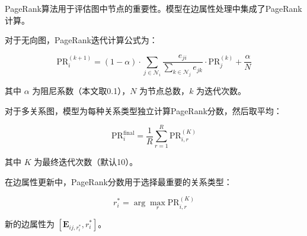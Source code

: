 PageRank算法用于评估图中节点的重要性。模型在边属性处理中集成了PageRank计算。

对于无向图，PageRank迭代计算公式为：

\begin{equation}
\text{PR}^{(k+1)}_i = (1 - \alpha) \cdot \sum_{j \in \mathcal{N}_i} \frac{e_{ji}}{\sum_{k \in \mathcal{N}_j} e_{jk}} \cdot \text{PR}^{(k)}_j + \frac{\alpha}{N}
\end{equation}

其中 $\alpha$ 为阻尼系数（本文取0.1），$N$ 为节点总数，$k$ 为迭代次数。

对于多关系图，模型为每种关系类型独立计算PageRank分数，然后取平均：

\begin{equation}
\text{PR}_i^{\text{final}} = \frac{1}{R} \sum_{r=1}^{R} \text{PR}_{i,r}^{(K)}
\end{equation}

其中 $K$ 为最终迭代次数（默认10）。

在边属性更新中，PageRank分数用于选择最重要的关系类型：

\begin{equation}
r_i^* = \arg\max_r \text{PR}_{i,r}^{(K)}
\end{equation}

新的边属性为 $[\mathbf{E}_{ij,r_i^*}, r_i^*]$。

